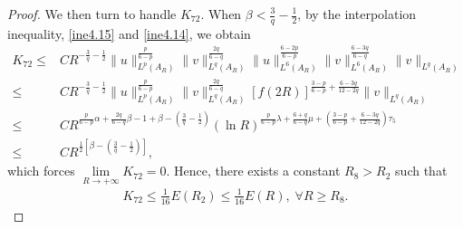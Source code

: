\documentclass[10pt,a4paper]{amsart}
\begin{document}
\begin{proof}
We then turn to handle $K_{72}$.
When $\beta<\frac{3}{q}-\frac{1}{2}$, by the interpolation inequality, \eqref{ine4.15} and \eqref{ine4.14}, we obtain
\begin{align*}
	K_{72} \leq& C R^{-\frac{3}{q}-\frac{1}{2}} \|u\|_{L^p(A_R)}^{\frac{p}{6-p}}\|v\|_{L^q(A_R)}^{\frac{2q}{6-q}} \|u\|_{L^6(A_R)}^{\frac{6-2p}{6-p}}\|v\|_{L^6(A_R)}^{\frac{6-3q}{6-q}}  \|v\|_{L^q(A_R)}\\
 \leq&C R^{-\frac{3}{q}-\frac{1}{2}}\|u\|_{L^p(A_R)}^{\frac{p}{6-p}}\|v\|_{L^q(A_R)}^{\frac{2q}{6-q}}\left[f(2R)\right]^{\frac{3-p}{6-p}+\frac{6-3q}{12-2q}}\|v\|_{L^q(A_R)}\\
 \leq&C R^{\frac{p}{6-p}\alpha+\frac{2q}{6-q}\beta-1+\beta-\left(\frac{3}{q}-\frac{1}{2}\right)}(\ln R)^{\frac{p}{6-p}\lambda+\frac{6+q}{6-q}\mu+\left(\frac{3-p}{6-p}+\frac{6-3q}{12-2q}\right)\tau_5}\\
 \leq&C R^{\frac{1}{2}\left[\beta-\left(\frac{3}{q}-\frac{1}{2}\right)\right]},
\end{align*}
which forces $\lim\limits_{R\rightarrow+\infty}K_{72}=0$. Hence, there exists a constant $R_8>R_2$ such that
\begin{align}\label{ine4.45}
K_{72}\leq\frac{1}{16}E(R_2)\leq \frac{1}{16}E(R),\;\forall R\geq R_8.
\end{align}



\end{proof}
\end{document}
